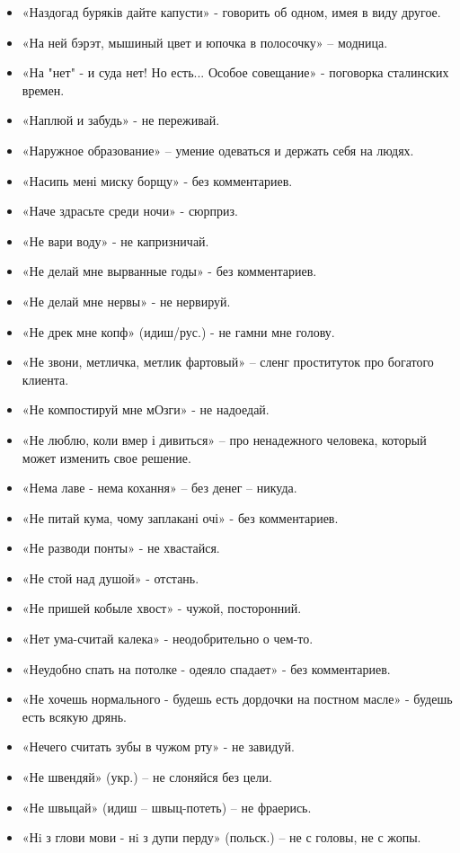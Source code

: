 \begin{itemize}
\item  «Наздогад буряків дайте капусти» - говорить об одном, имея в виду другое.
\item  «На ней бэрэт, мышиный цвет и юпочка в полосочку» – модница.
\item  «На "нет" - и суда нет! Но есть... Особое совещание» - поговорка сталинских времен.
\item  «Наплюй и забудь» - не переживай.
\item  «Наружное образование» – умение одеваться и держать себя на людях.
\item  «Насипь мені миску борщу» - без комментариев.
\item  «Наче здрасьте среди ночи» - сюрприз.
\item  «Не вари воду» - не капризничай.
\item  «Не делай мне вырванные годы» - без комментариев. 
\item  «Не делай мне нервы» - не нервируй.
\item  «Не дрек мне копф» (идиш/рус.) - не гамни мне голову. 
\item  «Не звони, метличка, метлик фартовый» – сленг проституток про богатого клиента.
\item  «Не компостируй мне мОзги» - не надоедай.
\item  «Не люблю, коли вмер і дивиться» – про ненадежного человека, который может изменить свое решение.
\item  «Нема лаве - нема кохання» – без денег – никуда.
\item  «Не питай кума, чому заплакані очі» - без комментариев.
\item  «Не разводи понты» - не хвастайся.
\item  «Не стой над душой» - отстань.
\item  «Не пришей кобыле хвост» - чужой, посторонний.
\item  «Нет ума-считай калека» - неодобрительно о чем-то.
\item  «Неудобно спать на потолке - одеяло спадает» - без комментариев.
\item  «Не хочешь нормального - будешь есть дордочки на постном масле» - будешь есть всякую дрянь.
\item  «Нечего считать зубы в чужом рту» - не завидуй.
\item  «Не швендяй» (укр.) – не слоняйся без цели.
\item  «Не швыцай» (идиш – швыц-потеть) – не фраерись.
\item  «Нi з глови мови - нi з дупи перду»  (польск.) – не с головы, не с жопы.

\end{itemize}
